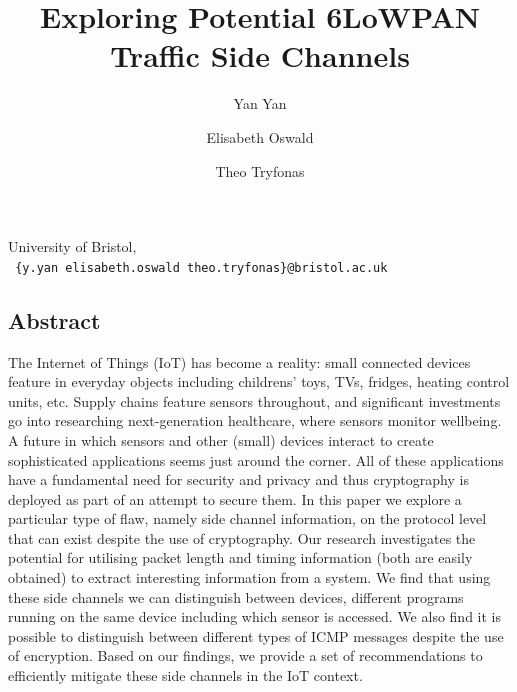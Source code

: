 \documentclass{article}
\title{Exploring Potential 6LoWPAN Traffic Side Channels}
\author{Yan Yan \and Elisabeth Oswald \and Theo Tryfonas}
\begin{document}
\maketitle
{
	\centering 
	University of Bristol, \\
	\texttt{
		\{y.yan elisabeth.oswald theo.tryfonas\}@bristol.ac.uk
	}
}


\subsection*{Abstract}
The Internet of Things (IoT) has become a reality: small connected devices feature in everyday objects
including childrens' toys, TVs, fridges, heating control units, etc. Supply chains feature sensors
throughout, and significant investments go into researching next-generation healthcare, 
where sensors monitor wellbeing. A future in which sensors and other (small) devices interact to create sophisticated applications seems just around the corner. All of these applications have a fundamental need for security and privacy and thus cryptography is deployed as part of an attempt to secure them. In this paper we explore a particular type of flaw, namely side channel information, on the protocol level that can exist despite the use of cryptography. Our research investigates the potential for utilising packet length and timing information (both are easily obtained) to extract interesting information from a system. We find that using these side channels we can distinguish between devices, different programs running on the same device including which sensor is accessed. We also find it is possible to distinguish between different types of ICMP messages despite the use of encryption. Based on our findings, we provide a set of recommendations to efficiently mitigate these side channels in the IoT context. 

\end{document}
